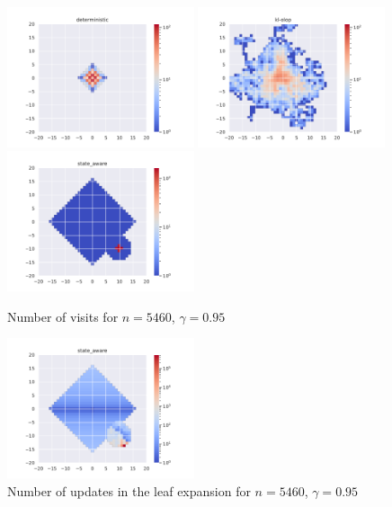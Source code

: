 \documentclass{article}
\begin{document}
\begin{figure}[H]
    \centering
    \includegraphics[width=0.49\textwidth]{img/4_occupations_deterministic.pdf}
    \includegraphics[width=0.49\textwidth]{img/4_occupations_kl-olop.pdf}
    \includegraphics[width=0.49\textwidth]{img/4_occupations_state_aware.pdf}
    \caption{Number of visits for $n = 5460$, $\gamma=0.95$}
    \label{fig:gw4_visits}
\end{figure}
\begin{figure}[H]
    \centering
    \includegraphics[width=0.49\textwidth]{img/4_updates_state_aware.pdf}
    \caption{Number of updates in the leaf expansion for $n = 5460$, $\gamma=0.95$}
    \label{fig:gw4_updates}
\end{figure}
\end{document}
